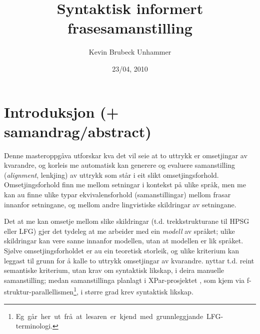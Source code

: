 \documentclass[11pt,a4paper,oneside,draft]{book}
\title{Syntaktisk informert frasesamanstilling }
\author{Kevin Brubeck Unhammer}
\date{23/04, 2010}
\begin{document}
\maketitle

\setcounter{tocdepth}{4}
\tableofcontents
\vspace*{1cm}


\listoffixmes
\chapter{Introduksjon (+ samandrag/abstract)}
\label{sec-1}

Denne masteroppgåva utforskar kva det vil seie at to uttrykk er
omsetjingar av kvarandre, og korleis me automatisk kan generere og
evaluere samanstilling (\emph{alignment}, lenkjing) av uttrykk som står i
eit slikt omsetjingsforhold. Omsetjingsforhold finn me mellom
setningar i kontekst på ulike språk, men me kan au finne ulike typar
ekvivalensforhold (samanstillingar) mellom frasar innanfor setningane,
og mellom andre lingvistiske skildringar av setningane.

Det at me kan omsetje mellom slike skildringar (t.d. trekkstrukturane
til HPSG eller LFG) gjer det tydeleg at me arbeider med ein \emph{modell} av
språket; ulike skildringar kan vere sanne innanfor modellen, utan at
modellen er lik språket. Sjølve omsetjingsforholdet er au ein
teoretisk storleik, og ulike kriterium kan leggast til grunn for å
kalle to uttrykk omsetjingar av kvarandre. \citet{samuelsson2006pap}
nyttar t.d. reint semantiske kriterium, utan krav om syntaktisk
likskap, i deira manuelle samanstilling; medan samanstillinga planlagt
i XPar-prosjektet \citep{xpar2008rcn}, som kjem via
f-struktur-parallellismen\footnote{Eg~går~her~ut~frå~at~lesaren~er~kjend~med~grunnleggjande~LFG-terminologi.},
i større grad krev syntaktisk likskap.
\end{document}
